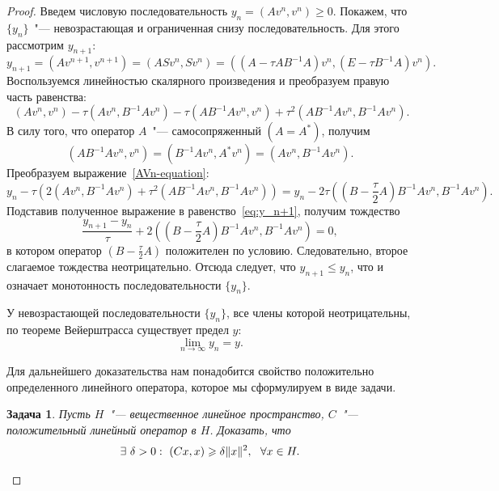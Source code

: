 \documentclass[11pt,a4paper,twoside,listtotoc,bibtotoc]{report}
\numberwithin{equation}{section}
\newtheorem*{problem}{Задача}
\theoremstyle{definition}
\theoremstyle{plain}
\DeclarePairedDelimiter\norm{\lVert}{\rVert}
\begin{document}
\begin{proof}
    Введем числовую последовательность $y_n = (Av^n, v^n) \geqslant 0$.
    Покажем, что $\{y_n\}$~"--- невозрастающая и ограниченная снизу
    последовательность. Для этого рассмотрим $y_{n+1}$:
    \begin{equation}
        \label{eq:y_n+1}
        y_{n+1} = (Av^{n+1}, v^{n+1}) = (ASv^n, Sv^n) =
            ((A - {\tau}AB^{-1}A)v^n, (E - {\tau}B^{-1}A)v^n).
    \end{equation}
    Воспользуемся линейностью скалярного произведения и преобразуем
    правую часть равенства:
    \begin{equation}
        \label{AVn-equation}
        ~
        (Av^n, v^n) - \tau (Av^n, B^{-1}Av^n) - \tau (AB^{-1}Av^n, v^n) +
            \tau^2(AB^{-1}Av^n, B^{-1}Av^n).
    \end{equation}
    В силу того, что оператор $A$~"--- самосопряженный $\left(A=A^*\right)$, получим
    $$
        \left(AB^{-1}Av^n,v^n\right) = \left(B^{-1}Av^n,A^*v^n\right)=
             \left(Av^n,B^{-1}Av^n\right).
    $$
    Преобразуем выражение~\eqref{AVn-equation}:
    $$
        y_n - \tau\left(2(Av^n, B^{-1}Av^n) +
            \tau^2(AB^{-1}Av^n, B^{-1}Av^n)\right)=
        y_n - 2\tau\left(\left(B - \frac{\tau}{2}A\right)B^{-1}Av^n, B^{-1}Av^n\right).
    $$
    Подставив полученное выражение в равенство~\eqref{eq:y_n+1}, получим тождество
    \begin{equation}
        \label{eq:wn-1}
        \frac{y_{n+1} - y_n}{\tau} +
        2\left(\left(B - \frac{\tau}{2}A\right)B^{-1}Av^n, B^{-1}Av^n\right) = 0,
    \end{equation}
    в котором оператор $\left(B - \frac{\tau}{2}A\right)$
    положителен по условию. Следовательно, второе слагаемое тождества неотрицательно.
    Отсюда следует,
    что $y_{n+1} \leqslant y_n$, что и означает монотонность последовательности
    $\{y_n\}$.

    У невозрастающей последовательности $\{y_n\}$, все члены которой
    неотрицательны, по теореме Вейерштрасса существует предел $y$:
    $$
        \lim_{n \to \infty} y_n = y.
    $$

    Для дальнейшего доказательства нам понадобится свойство
    положительно определенного линейного оператора,
    которое мы сформулируем в виде задачи.
    \begin{problem}
        Пусть $H$~"--- вещественное линейное пространство, $C$~"---
        положительный линейный оператор в $H$. Доказать, что
        \begin{equation}
            \label{eq:delta-prop}
            \exists ~\delta > 0: ~(Cx, x) \geqslant \delta\norm{x}^2,~~\forall x \in H.
        \end{equation}
    \end{problem}


\end{proof}
\end{document}
